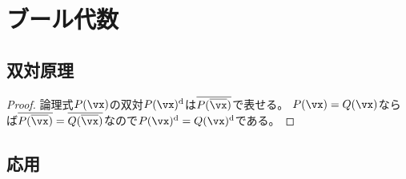 \chapter{ブール代数}
    \section{双対原理}
        \begin{proof}
            論理式$P(\vx)$の双対$P(\vx)^\mathrm{d}$は$\overline{P(\overline{\vx})}$で表せる。
            $P(\vx)=Q(\vx)$ならば$\overline{P(\overline{\vx})} = \overline{Q(\overline{\vx})}$なので$P(\vx)^\mathrm{d} = Q(\vx)^\mathrm{d}$である。
        \end{proof}
    \section{応用}
